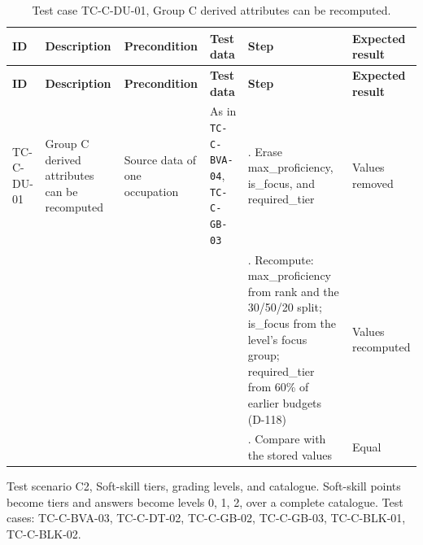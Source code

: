 {\footnotesize{}\renewcommand{\arraystretch}{1.1}
\begin{longtable}{|>{\raggedright\arraybackslash}p{}|>{\raggedright\arraybackslash}p{}|>{\raggedright\arraybackslash}p{}|>{\raggedright\arraybackslash}p{}|>{\raggedright\arraybackslash}p{}|>{\raggedright\arraybackslash}p{}|}
\caption{Test case TC-C-DU-01, Group C derived attributes can be recomputed.} \\
\hline
\textbf{ID} & \textbf{Description} & \textbf{Precondition} & \textbf{Test data} & \textbf{Step} & \textbf{Expected result} \\ \hline
\endfirsthead
\hline
\textbf{ID} & \textbf{Description} & \textbf{Precondition} & \textbf{Test data} & \textbf{Step} & \textbf{Expected result} \\ \hline
\endhead
TC-C-DU-01 & Group C derived attributes can be recomputed & Source data of one occupation & As in \texttt{TC-\allowbreak{}C-\allowbreak{}BVA-\allowbreak{}04}, \texttt{TC-\allowbreak{}C-\allowbreak{}GB-\allowbreak{}03} & 1. Erase max\_\allowbreak{}proficiency, is\_focus, and required\_\allowbreak{}tier & Values removed \\ \cline{5-6}
 &  &  &  & 2. Recompute: max\_\allowbreak{}proficiency from rank and the 30/50/20 split; is\_focus from the level's focus group; required\_\allowbreak{}tier from 60\% of earlier budgets (D-118) & Values recomputed \\ \cline{5-6}
 &  &  &  & 3. Compare with the stored values & Equal \\ \hline
\end{longtable}
}

Test scenario C2, Soft-skill tiers, grading levels, and catalogue. Soft-skill points become tiers and answers become levels 0, 1, 2, over a complete catalogue. Test cases: TC-\allowbreak{}C-\allowbreak{}BVA-\allowbreak{}03, TC-C-DT-02, TC-C-GB-02, TC-C-GB-03, TC-\allowbreak{}C-\allowbreak{}BLK-\allowbreak{}01, TC-\allowbreak{}C-\allowbreak{}BLK-\allowbreak{}02.

